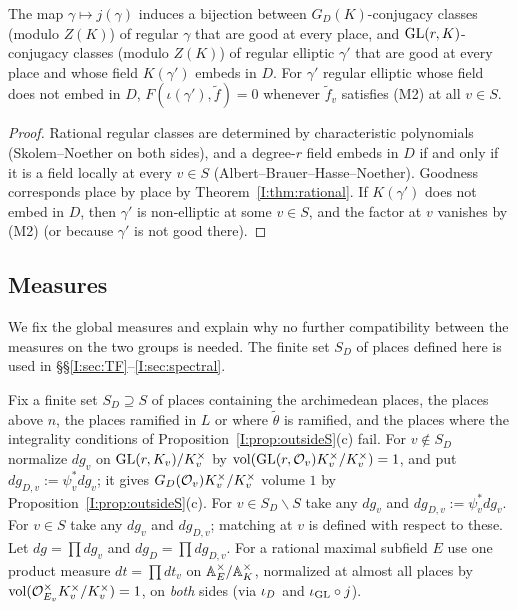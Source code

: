 \begin{corollary}\label{I:cor:rationalbij}
The map $\gamma\mapsto j(\gamma)$ induces a bijection between $G_D(K)$-conjugacy classes (modulo $Z(K)$) of regular $\gamma$ that are good at every place, and $\mathrm{GL}(r,K)$-conjugacy classes (modulo $Z(K)$) of regular elliptic $\gamma'$ that are good at every place and whose field $K(\gamma')$ embeds in $D$. For $\gamma'$ regular elliptic whose field does not embed in $D$, $F(\iota(\gamma'),\tilde f)=0$ whenever $\tilde f_v$ satisfies (M2) at all $v\in S$.
\end{corollary}
\begin{proof}
Rational regular classes are determined by characteristic polynomials (Skolem--Noether on both sides), and a degree-$r$ field embeds in $D$ if and only if it is a field locally at every $v\in S$ (Albert--Brauer--Hasse--Noether). Goodness corresponds place by place by Theorem~\ref{I:thm:rational}. If $K(\gamma')$ does not embed in $D$, then $\gamma'$ is non-elliptic at some $v\in S$, and the factor at $v$ vanishes by (M2) (or because $\gamma'$ is not good there).
\end{proof}

\subsection{Measures}\label{I:subsec:measures}
We fix the global measures and explain why no further compatibility between the measures on the two groups is needed. The finite set $S_D$ of places defined here is used in \S\S\ref{I:sec:TF}--\ref{I:sec:spectral}.

Fix a finite set $S_D\supseteq S$ of places containing the archimedean places, the places above $n$, the places ramified in $L$ or where $\tilde\theta$ is ramified, and the places where the integrality conditions of Proposition~\ref{I:prop:outsideS}(c) fail. For $v\notin S_D$ normalize $dg_v$ on $\mathrm{GL}(r,K_v)/K_v^\times$ by $\operatorname{vol}(\mathrm{GL}(r,\mathcal{O}_v)K_v^\times/K_v^\times)=1$, and put $dg_{D,v}:=\psi_v^*dg_v$; it gives $G_D(\mathcal{O}_v)K_v^\times/K_v^\times$ volume $1$ by Proposition~\ref{I:prop:outsideS}(c). For $v\in S_D\smallsetminus S$ take any $dg_v$ and $dg_{D,v}:=\psi_v^*dg_v$. For $v\in S$ take any $dg_v$ and $dg_{D,v}$; matching at $v$ is defined with respect to these. Let $dg=\prod dg_v$ and $dg_D=\prod dg_{D,v}$. For a rational maximal subfield $E$ use one product measure $dt=\prod dt_v$ on $\mathbb{A}_E^\times/\mathbb{A}_K^\times$, normalized at almost all places by $\operatorname{vol}(\mathcal{O}_{E_v}^\times K_v^\times/K_v^\times)=1$, on \emph{both} sides (via $\iota_D$ and $\iota_{\mathrm{GL}}\circ j$).

